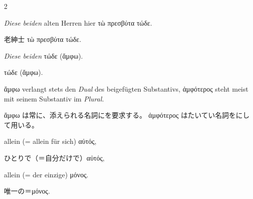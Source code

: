 \begin{paracol}{2}
\begin{enumerate}[leftmargin=0pt,rightmargin=0pt,listparindent =1cm,labelindent=1cm,labelsep=1ex,labelwidth={*},itemindent={*},align=left]
\begin{continuousitemline}
\begin{german}
\emph{Diese beiden} alten Herren hier \textgreek[variant=ancient]{τὼ
πρεσβύτα τώδε.}
\end{german}
\switchcolumn

\begin{japanese}
老紳士 \textgreek[variant=ancient]{τὼ πρεσβύτα τώδε.}
\end{japanese}
\switchcolumn*

\begin{german}
\emph{Diese beiden} \textgreek[variant=ancient]{τώδε (ἄμφω).}
\end{german}
\switchcolumn

\begin{japanese}
 \textgreek[variant=ancient]{τώδε (ἄμφω).}
\end{japanese}
\switchcolumn*
\end{continuousitemline}

\begin{german}
\textgreek[variant=ancient]{ἄμφω} verlangt stets den \emph{Dual}
des beigefügten Substantivs, \textgreek[variant=ancient]{ἀμφότερος}
steht meist mit seinem Substantiv im \emph{Plural.}
\end{german}
\switchcolumn

\begin{japanese}
\textgreek[variant=ancient]{ἄμφω} は常に、添えられる名詞にを要求する。
\textgreek[variant=ancient]{ἀμφότερος} はたいてい名詞をにして用いる。
\end{japanese}
\switchcolumn*

\begin{german}
\item allein (= allein für sich) \textgreek[variant=ancient]{αὐτός,}
\end{german}
\switchcolumn

\begin{japanese}
ひとりで（＝自分だけで）\textgreek[variant=ancient]{αὐτός,}
\end{japanese}
\switchcolumn*

\begin{continuousitemline}
\begin{german}
allein (= der einzige) \textgreek[variant=ancient]{μόνος.}
\end{german}
\switchcolumn

\begin{japanese}
唯一の＝\textgreek[variant=ancient]{μόνος.}
\end{japanese}
\switchcolumn*


\end{continuousitemline}
\end{enumerate}
\end{paracol}

